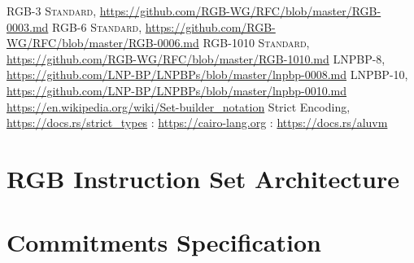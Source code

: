 \documentclass[a4paper]{article}
\begin{document}
\begin{multicols}{2}

\begin{thebibliography}{9}
 \textsc{RGB-3 Standard}, \url{https://github.com/RGB-WG/RFC/blob/master/RGB-0003.md}
 \textsc{RGB-6 Standard}, \url{https://github.com/RGB-WG/RFC/blob/master/RGB-0006.md}
 \textsc{RGB-1010 Standard}, \url{https://github.com/RGB-WG/RFC/blob/master/RGB-1010.md}
 \textsc{LNPBP-8}, \url{https://github.com/LNP-BP/LNPBPs/blob/master/lnpbp-0008.md}
 \textsc{LNPBP-10}, \url{https://github.com/LNP-BP/LNPBPs/blob/master/lnpbp-0010.md}
 \url{https://en.wikipedia.org/wiki/Set-builder_notation}
 Strict Encoding, \url{https://docs.rs/strict_types}
: \url{https://cairo-lang.org}
: \url{https://docs.rs/aluvm}
\end{thebibliography}

\end{multicols}

\newpage

\appendix
\section{RGB Instruction Set Architecture}\label{AnnexA}

\section{Commitments Specification}\label{AnnexB}

\newpage

\printglossaries
\end{document}
